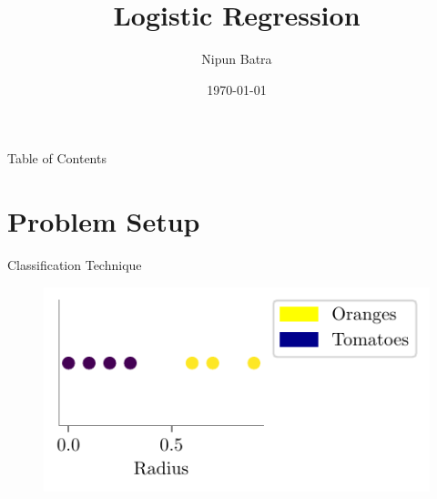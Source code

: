 \documentclass{beamer}
\title{Logistic Regression}
\date{\today}
\author{Nipun Batra}
\institute{IIT Gandhinagar}
\begin{document}
\maketitle

\begin{frame}{Table of Contents}
\tableofcontents
\end{frame}

\section{Problem Setup}
	
	\begin{frame}{Classification Technique}
	\begin{minipage}{0.3\textwidth}
		
		\begin{figure}
			
			\includegraphics{../assets/logistic-regression/figures/logistic-orange-tomatoes-original.pdf}
		\end{figure}
	\end{minipage} \\

	
\end{frame}
	
\end{document}
